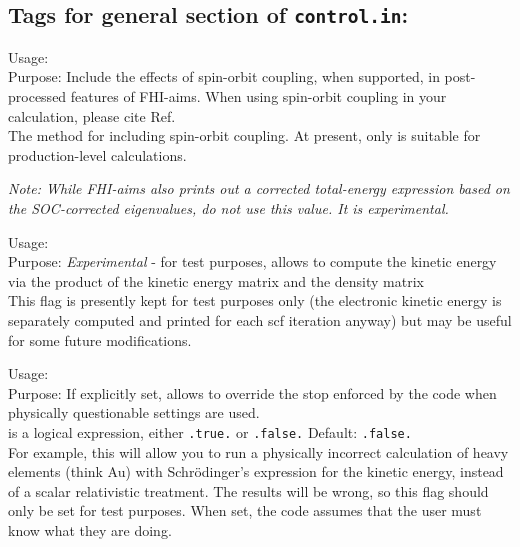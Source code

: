 \newpage

\subsection*{Tags for general section of \texttt{control.in}:}

{
  \noindent
  Usage:   \\[1.0ex]
  Purpose:  Include the effects of spin-orbit coupling, when supported, in 
  post-processed features of FHI-aims.  When using spin-orbit coupling in 
  your calculation, please cite Ref.~\cite{Huhn2017_SOC} \\[1.0ex] 
   The method for including spin-orbit coupling.  At present, 
  only   is suitable for 
  production-level calculations. \\[1.0ex] 
}

\emph{Note: While FHI-aims also prints out a corrected total-energy
  expression based on the SOC-corrected eigenvalues, do not use this 
  value. It is experimental.} 

{
  \noindent
  Usage:  \\[1.0ex]
  Purpose: \emph{Experimental} - for test purposes, allows to compute the kinetic energy via
    the product of the kinetic energy matrix and the density matrix
    \\[1.0ex]
}
This flag is presently kept for test purposes only (the electronic
kinetic energy is separately computed and printed for each scf
iteration anyway) but may be useful for some future modifications.

{
  \noindent
  Usage:   \\[1.0ex]
  Purpose: If explicitly set, allows to override the stop enforced by
  the code when physically questionable 
  settings are used.  \\[1.0ex]
   is a logical expression, either \texttt{.true.} or
    \texttt{.false.} Default: \texttt{.false.} \\
}
For example, this will allow you to run a physically incorrect
calculation of heavy elements (think Au) with Schr\"odinger's
expression for the kinetic energy, instead of a scalar relativistic
treatment. The results will be wrong, so this flag should only be set
for test purposes. When set, the code assumes that the user must know
what they are doing.

